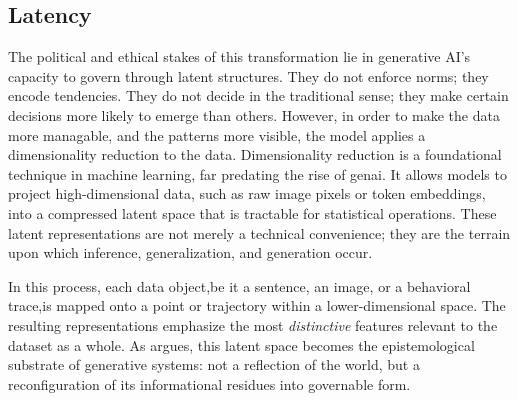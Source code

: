 \subsection{Latency}





The political and ethical stakes of this transformation lie in generative AI’s capacity to govern through latent structures. They do not enforce norms; they encode tendencies. They do not decide in the traditional sense; they make certain decisions more likely to emerge than others. However, in order to make the data more managable, and the patterns more visible, the model applies a dimensionality reduction to the data. Dimensionality reduction is a foundational technique in machine learning, far predating the rise of \gls{genai}. It allows models to project high-dimensional data, such as raw image pixels or token embeddings, into a compressed latent space that is tractable for statistical operations. These latent representations are not merely a technical convenience; they are the terrain upon which inference, generalization, and generation occur.

In this process, each data object,be it a sentence, an image, or a behavioral trace,is mapped onto a point or trajectory within a lower-dimensional space. The resulting representations emphasize the most \emph{distinctive} features relevant to the dataset as a whole. As \textcite[4]{amoore2024} argues, this latent space becomes the epistemological substrate of generative systems: not a reflection of the world, but a reconfiguration of its informational residues into governable form.



